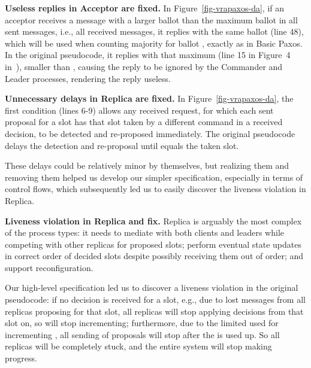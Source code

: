 \documentclass[11pt]{article}
\begin{document}
\begin{description}

\item {\bf Useless replies in Acceptor are fixed.}
In %
Figure~\ref{fig-vrapaxos-da}, if an acceptor receives a  message
with a larger ballot  than the maximum ballot in all sent 
messages, i.e., all received  messages, it replies with the same
ballot  (line 48), which will be used when counting majority for
ballot , exactly as in Basic Paxos.  In the original pseudocode, it
replies with that maximum (line 15 in Figure~4 %
in~\cite{vra15paxos}), smaller than , causing the reply to be ignored by
the Commander and Leader processes, rendering the reply useless.


\item {\bf Unnecessary delays in Replica are fixed.}
In Figure~\ref{fig-vrapaxos-da}, the first  condition (lines 6-9)
allows any received request, for which each sent proposal for a slot has
that slot taken by a different command in a received decision, to be
detected and re-proposed immediately.  The original pseudocode delays the
detection and re-proposal until  equals the taken slot.

These delays could be relatively minor by themselves, but realizing them and
removing them helped us develop our simpler specification, especially in
terms of control flows, which subsequently led us to easily discover the
liveness violation in Replica.

\item {\bf Liveness violation in Replica and fix.}
Replica is arguably the most complex of the process types: it needs to
mediate with both clients and leaders while competing with other replicas
for proposed slots; perform eventual state updates in correct order of
decided slots despite possibly receiving them out of order; and
support reconfiguration. %

Our high-level specification led us to discover a liveness violation in the
original pseudocode: if no decision is received for a slot, e.g., due to lost
 messages from all replicas proposing for that slot,
all replicas will stop applying decisions from that slot on, so
 will stop incrementing; furthermore, due to the limited
 used for incrementing , all sending of proposals
will stop after the  is used up.  So all replicas will be
completely stuck, and the entire system will stop making progress.


\end{description}
\end{document}
